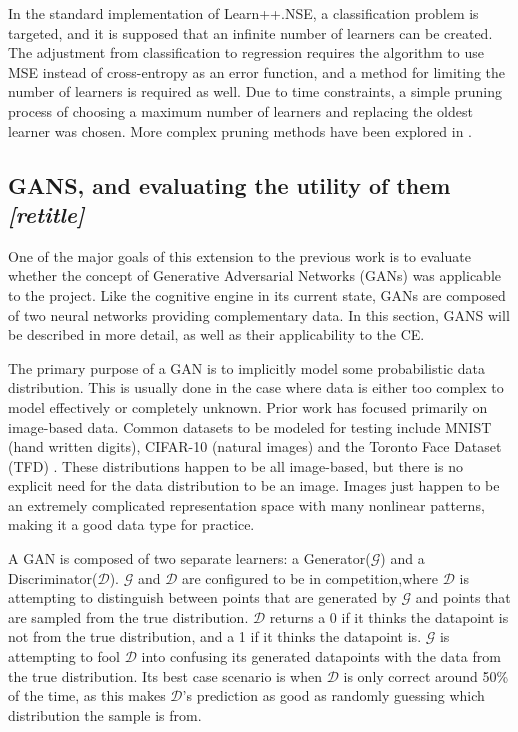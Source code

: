 	\par In the standard implementation of Learn++.NSE, a classification problem is targeted, and it is supposed that an infinite number of learners can be created. The adjustment from classification to regression requires the algorithm to use MSE instead of cross-entropy as an error function, and a method for limiting the number of learners is required as well. Due to time constraints, a simple pruning process of choosing a maximum number of learners and replacing the oldest learner was chosen. More complex pruning methods have been explored in \cite{placeholderCitation}.
	\clearpage
	\subsection {GANS, and evaluating the utility of them \textit{[retitle]}}
	\par One of the major goals of this extension to the previous work is to evaluate whether the concept of Generative Adversarial Networks (GANs) \cite{placeholderCitation} was applicable to the project. Like the cognitive engine in its current state, GANs are composed of two neural networks providing complementary data. In this section, GANS will be described in more detail, as well as their applicability to the CE.  
	\par The primary purpose of a GAN is to implicitly model some probabilistic data distribution. This is usually done in the case where data is either too complex to model effectively or completely unknown. Prior work has focused primarily on image-based data. Common datasets to be modeled for testing include MNIST (hand written digits), CIFAR-10 (natural images) and the Toronto Face Dataset (TFD) \cite{gan_overview}. These distributions happen to be all image-based, but there is no explicit need for the data distribution to be an image. Images just happen to be an extremely complicated representation space with many nonlinear patterns, making it a good data type for practice.
	\par A GAN is composed of two separate learners: a Generator($\mathcal{G}$) and a Discriminator($\mathcal{D}$). $\mathcal{G}$ and $\mathcal{D}$ are configured to be in competition,where $\mathcal{D}$ is attempting to distinguish between points that are generated by $\mathcal{G}$ and points that are sampled from the true distribution. $\mathcal{D}$ returns a 0 if it thinks the datapoint is not from the true distribution, and a 1 if it thinks the datapoint is. $\mathcal{G}$ is attempting to fool $\mathcal{D}$ into confusing its generated datapoints with the data from the true distribution. Its best case scenario is when $\mathcal{D}$ is only correct around 50\% of the time, as this makes $\mathcal{D}$'s prediction as good as randomly guessing which distribution the sample is from.
